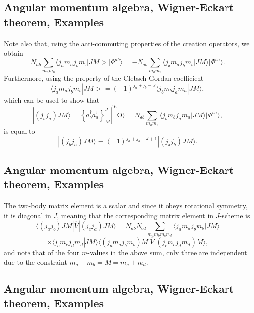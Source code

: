 \documentclass[%
twoside,                 %
final,                   %
10pt]{article}
\begin{document}
\subsection*{Angular momentum algebra, Wigner-Eckart theorem, Examples}

\paragraph{}
Note also that, using the anti-commuting 
properties of the creation operators, we obtain
\[
N_{ab}\sum_{m_am_b}\langle j_am_aj_bm_b|JM>|\Phi^{ab}\rangle=-N_{ab}\sum_{m_am_b}\langle j_am_aj_bm_b|JM\rangle|\Phi^{ba}\rangle.
\]
Furthermore, using the property of the Clebsch-Gordan coefficient
\[
\langle j_am_aj_bm_b|JM>=(-1)^{j_a+j_b-J}\langle j_bm_bj_am_a|JM\rangle,
\]
which can be used to show that
\[
|(j_bj_a)JM\rangle  = \left\{a^{\dagger}_ba^{\dagger}_a\right\}^J_M|^{16}\mathrm{O}\rangle=N_{ab}\sum_{m_am_b}\langle j_bm_bj_am_a|JM\rangle|\Phi^{ba}\rangle, 
\]
is equal to 
\[
|(j_bj_a)JM\rangle=(-1)^{j_a+j_b-J+1}|(j_aj_b)JM\rangle.
\]




\subsection*{Angular momentum algebra, Wigner-Eckart theorem, Examples}

\paragraph{}
The two-body matrix element is a scalar and since it obeys rotational symmetry, it is diagonal in $J$, 
meaning that the corresponding matrix element in $J$-scheme is 
\[
\langle (j_aj_b) JM | \hat{V} | (j_cj_d) JM \rangle = N_{ab}N_{cd}\sum_{m_am_bm_cm_d}\langle j_am_aj_bm_b|JM\rangle
\]
\[
\times \langle j_cm_cj_dm_d|JM\rangle\langle (j_am_aj_bm_b)M |  \hat{V} | (j_cm_cj_dm_d)M \rangle,
\]
and note that of the four $m$-values in the above sum, only three are independent due to the constraint $m_a+m_b=M=m_c+m_d$.



\subsection*{Angular momentum algebra, Wigner-Eckart theorem, Examples}
\end{document}
